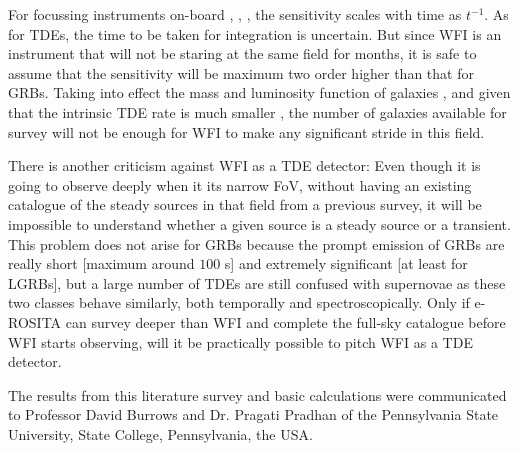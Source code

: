 For focussing instruments on-board \X, \C, \A, the sensitivity scales with time as $t^{-1}$. As for TDEs, the time to be taken for integration is uncertain. But since WFI is an instrument that will not be staring at the same field for months, it is safe to assume that the sensitivity will be maximum two order higher than that for GRBs. Taking into effect the mass and luminosity function of galaxies \citep{Conselice_et_al.-2016-ApJ}, and given that the intrinsic TDE rate is much smaller \citep{Auchettl_et_al.-2018-ApJ}, the number of galaxies available for survey will not be enough for WFI to make any significant stride in this field.

There is another criticism against WFI as a TDE detector: Even though it is going to observe deeply when it its narrow FoV, without having an existing catalogue of the steady sources in that field from a previous survey, it will be impossible to understand whether a given source is a steady source or a transient. This problem does not arise for GRBs because the prompt emission of GRBs are really short [maximum around $100$ s] and extremely significant [at least for LGRBs], but a large number of TDEs are still confused with supernovae as these two classes behave similarly, both temporally and spectroscopically. Only if e-ROSITA can survey deeper than WFI and complete the full-sky catalogue before WFI starts observing, will it be practically possible to pitch WFI as a TDE detector.

\begin{checkit}
The results from this literature survey and basic calculations were communicated to Professor David Burrows and Dr. Pragati Pradhan of the Pennsylvania State University, State College, Pennsylvania, the USA.
\end{checkit}